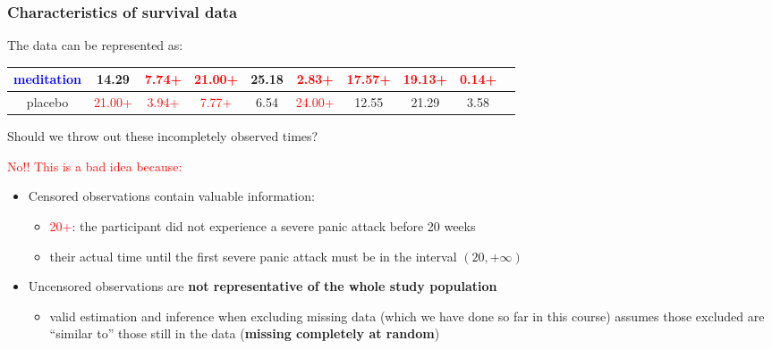 \documentclass[10pt,t]{beamer}
\begin{document}
\begin{frame}
\frametitle{Characteristics of survival data}

\vspace{-6 mm}
The data can be represented as:
\medskip

{\fontsize{7.5pt}{7.2}\selectfont
\begin{tabular}{|c|c|c|c|c|c|c|c|c|c|}
\hline
\textcolor{blue}{meditation} & 14.29  & \textcolor{red}{7.74+} & \textcolor{red}{21.00+} & 25.18  &  \textcolor{red}{2.83+} & \textcolor{red}{17.57+} & \textcolor{red}{19.13+} &  \textcolor{red}{0.14+}  \\
\hline
placebo & \textcolor{red}{21.00+} &  \textcolor{red}{3.94+} &  \textcolor{red}{7.77+} &  6.54  & \textcolor{red}{24.00+} & 12.55  & 21.29 &  3.58 \\
\hline
\end{tabular}
}

Should we throw out these incompletely observed times?   

\smallskip

 \textcolor{red}{No!! This is a bad idea because:} 

\medskip

\begin{itemize}
\item Censored observations contain valuable information:  

\medskip
\begin{itemize}
\item \textcolor{red}{20+}: the participant did not experience a severe panic attack before 20 weeks  

\medskip

	\item their actual time until the first severe panic attack must be in the interval $(20, +\infty)$ 

\end{itemize}
\medskip

\item Uncensored observations are \textbf{not representative of the whole study population}

\begin{itemize}
	\medskip
	
	\item valid estimation and inference when excluding missing data (which we have done so far in this course) assumes those excluded are ``similar to'' those still in the data (\textbf{missing completely at random})
\end{itemize}
  
\end{itemize}

\end{frame}
\end{document}
